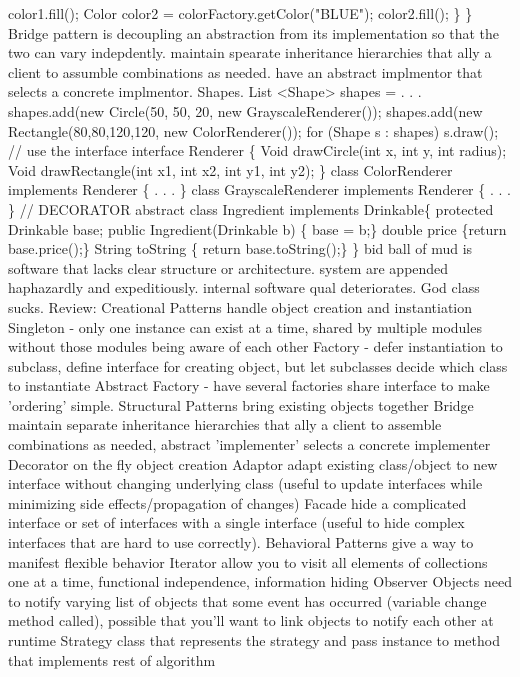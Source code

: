 \documentclass[10pt]{article}
\begin{document}
\begin{landscape}
\begin{multicols*}{6}
color1.fill();
Color color2 = colorFactory.getColor("BLUE");
color2.fill();
\}
\}
Bridge pattern is decoupling an abstraction from its implementation so that the two can vary indepdently. maintain spearate inheritance hierarchies that ally a client to assumble combinations as needed. have an abstract implmentor that selects a concrete implmentor. Shapes.
List
<Shape>
shapes = . . .
shapes.add(new Circle(50, 50, 20, new GrayscaleRenderer());
shapes.add(new Rectangle(80,80,120,120,
new ColorRenderer());
for (Shape s : shapes)
s.draw(); // use the interface
interface Renderer \{
Void drawCircle(int x, int y, int radius); Void drawRectangle(int x1, int x2,
int y1, int y2);
\} class ColorRenderer implements Renderer \{
. . . \}
class GrayscaleRenderer implements Renderer \{
. . . \}
// DECORATOR
abstract class Ingredient implements Drinkable\{
protected Drinkable base; public Ingredient(Drinkable b) \{
base = b;\}
double price \{return base.price();\} String toString \{
return base.toString();\}
\}
bid ball of mud is software that lacks clear structure or architecture. system are appended haphazardly and expeditiously. internal software qual deteriorates. God class sucks.
Review: Creational Patterns handle object creation and instantiation Singleton - only one instance can exist at a time, shared by multiple modules without those modules being aware of each other Factory - defer instantiation to subclass, define interface for creating object, but let subclasses decide which class to instantiate Abstract Factory - have several factories share interface to make 'ordering' simple. Structural Patterns bring existing objects together Bridge maintain separate inheritance hierarchies that ally a client to assemble combinations as needed, abstract 'implementer' selects a concrete implementer Decorator on the fly object creation Adaptor adapt existing class/object to new interface without changing underlying class (useful to update interfaces while minimizing side effects/propagation of changes) Facade hide a complicated interface or set of interfaces with a single interface (useful to hide complex interfaces that are hard to use correctly). Behavioral Patterns give a way to manifest flexible behavior Iterator allow you to visit all elements of collections one at a time, functional independence, information hiding Observer Objects need to notify varying list of objects that some event has occurred (variable change method called), possible that you'll want to link objects to notify each other at runtime Strategy class that represents the strategy and pass instance to method that implements rest of algorithm


\end{multicols*}
\end{landscape}
\end{document}
